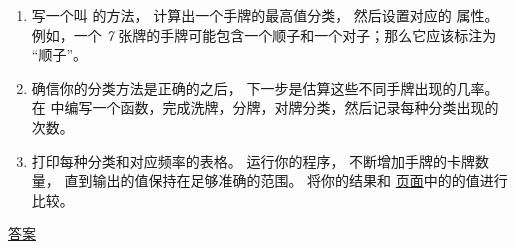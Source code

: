\begin{exercise}
\begin{enumerate}
\item 写一个叫 {\em {}} 的方法， 计算出一个手牌的最高值分类， 然后设置对应的 {\em {}} 属性。  例如，一个 {\em 7} 张牌的手牌可能包含一个顺子和一个对子；那么它应该标注为 ``顺子''。


\item 确信你的分类方法是正确的之后， 下一步是估算这些不同手牌出现的几率。  在 {\em {}} 中编写一个函数，完成洗牌，分牌，对牌分类，然后记录每种分类出现的次数。


\item 打印每种分类和对应频率的表格。  运行你的程序， 不断增加手牌的卡牌数量， 直到输出的值保持在足够准确的范围。  将你的结果和 \href{http://en.wikipedia.org/wiki/Hand_rankings}{页面}中的的值进行比较。


\end{enumerate}


\href{http://thinkpython2.com/code/PokerHandSoln.py}{答案}

\end{exercise}